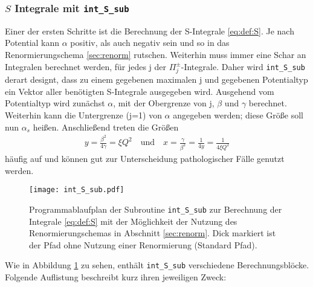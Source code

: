 \subsubsection{$S$ Integrale mit \texttt{int\_S\_sub}}
%
Einer der ersten Schritte ist die Berechnung der S-Integrale \ref{eq:def:S}. Je 
nach Potential kann $\alpha$ positiv, als auch negativ sein und so in das 
Renormierungschema \ref{sec:renorm} rutschen. Weiterhin muss immer eine Schar 
an Integralen berechnet werden, für jedes j der $\Pi^\pm_j$-Integrale. Daher 
wird \texttt{int\_S\_sub} derart designt, dass zu einem gegebenen maximalen j 
und 
gegebenen Potentialtyp ein Vektor aller benötigten S-Integrale ausgegeben wird.
Ausgehend vom Potentialtyp wird zunächst $\alpha$, mit der Obergrenze von j, 
$\beta$ und $\gamma$ berechnet. Weiterhin kann die Untergrenze (j=1) von 
$\alpha$ angegeben werden; diese Größe soll nun $\alpha_s$ heißen. Anschließend 
treten die Größen
\begin{align}\label{eq:def:parameter y,x}
y=\frac{\beta^2}{4 \gamma}= \xi Q^2 \quad\text{und}\quad 
x=\frac{\gamma}{\beta^2}=\frac{1}{4y}=\frac{1}{4\xi Q^2}
\end{align}
häufig auf und können gut zur Unterscheidung pathologischer Fälle genutzt 
werden.
%
\begin{figure}[H] \centering
	\texttt{[image: int\_S\_sub.pdf]}
	\caption{Programmablaufplan der Subroutine \texttt{int\_S\_sub} zur 
	Berechnung der 
	Integrale \ref{eq:def:S} mit der Möglichkeit der Nutzung des 
	Renormierungschemas in Abschnitt \ref{sec:renorm}. Dick markiert ist der 
	Pfad ohne Nutzung einer Renormierung (Standard Pfad).}
	\vspace{2mm} %
	\label{pic:FC:int_S_sub} 
\end{figure}
%
Wie in Abbildung \ref{pic:FC:int_S_sub} zu sehen, enthält \texttt{int\_S\_sub} 
verschiedene Berechnungsblöcke. Folgende Auflistung beschreibt kurz ihren 
jeweiligen Zweck:
%
